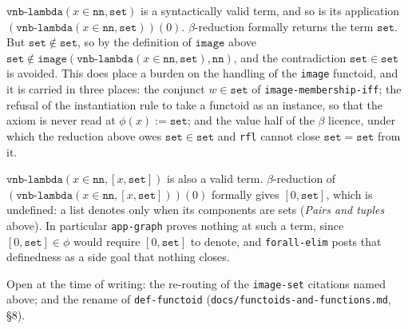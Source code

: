 \begin{remark}
$\texttt{vnb-lambda}(x \in \mathtt{nn}, \mathtt{set})$ is a syntactically
valid term, and so is its application
$(\texttt{vnb-lambda}(x \in \mathtt{nn}, \mathtt{set}))(0)$.  $\beta$-reduction
formally returns the term $\mathtt{set}$.  But $\mathtt{set} \notin
\mathtt{set}$, so by the definition of $\mathtt{image}$ above
$\mathtt{set} \notin \mathtt{image}(\texttt{vnb-lambda}(x \in \mathtt{nn},
\mathtt{set}), \mathtt{nn})$, and the contradiction $\mathtt{set} \in
\mathtt{set}$ is avoided.  This does place a burden on the handling of the
\texttt{image} functoid, and it is carried in three places: the conjunct
$w \in \mathtt{set}$ of \texttt{image-membership-iff}; the refusal of the
instantiation rule to take a functoid as an instance, so that the axiom is
never read at $\phi(x) := \mathtt{set}$; and the value half of the
$\beta$ licence, under which the reduction above owes
$\mathtt{set} \in \mathtt{set}$ and \texttt{rfl} cannot close
$\mathtt{set} = \mathtt{set}$ from it.
\end{remark}

\begin{remark}
$\texttt{vnb-lambda}(x \in \mathtt{nn}, [x, \mathtt{set}])$ is also a valid
term.  $\beta$-reduction of
$(\texttt{vnb-lambda}(x \in \mathtt{nn}, [x, \mathtt{set}]))(0)$ formally
gives $[0, \mathtt{set}]$, which is undefined: a list denotes only when its
components are sets (\emph{Pairs and tuples} above).  In particular
\texttt{app-graph} proves nothing at such a term, since $[0, \mathtt{set}]
\in \phi$ would require $[0, \mathtt{set}]$ to denote, and
\texttt{forall-elim} posts that definedness as a side goal that nothing
closes.
\end{remark}

Open at the time of writing: the re-routing of the \texttt{image-set} citations
named above; and the rename of \texttt{def-functoid}
(\texttt{docs/functoids-and-functions.md}, \S8).
